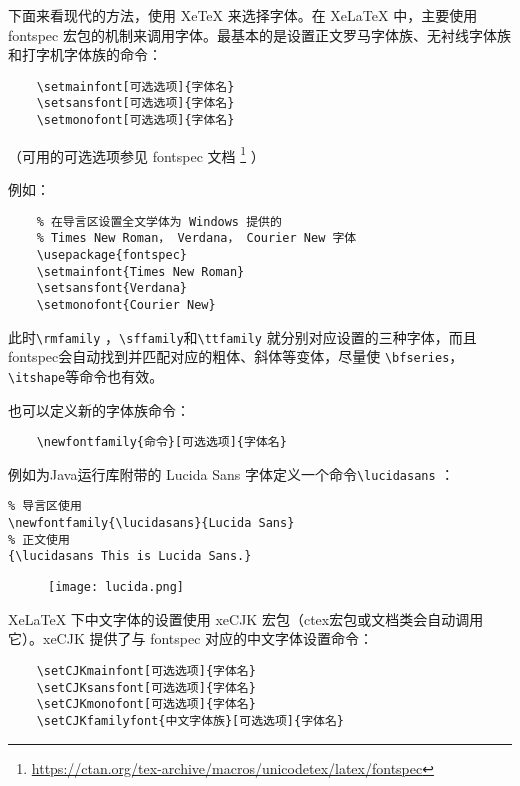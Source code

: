 下面来看现代的方法，使用 XeTeX 来选择字体。在 XeLaTeX 中，主要使用 fontspec 宏包的机制来调用字体。最基本的是设置正文罗马字体族、无衬线字体族和打字机字体族的命令：

\begin{lstlisting}
    \setmainfont[可选选项]{字体名}
    \setsansfont[可选选项]{字体名}
    \setmonofont[可选选项]{字体名}
\end{lstlisting}

（可用的可选选项参见 fontspec 文档 \footnote{\href{https://ctan.org/tex-archive/macros/unicodetex/latex/fontspec}{https://ctan.org/tex-archive/macros/unicodetex/latex/fontspec}} ）

例如：
\begin{lstlisting}
    % 在导言区设置全文学体为 Windows 提供的
    % Times New Roman， Verdana， Courier New 字体
    \usepackage{fontspec}
    \setmainfont{Times New Roman}
    \setsansfont{Verdana}
    \setmonofont{Courier New}
\end{lstlisting}

此时\verb|\rmfamily| ，\verb|\sffamily|和\verb|\ttfamily| 就分别对应设置的三种字体，而且 fontspec会自动找到并匹配对应的粗体、斜体等变体，尽量使 \verb|\bfseries|，\verb|\itshape|等命令也有效。

也可以定义新的字体族命令：
\begin{lstlisting}
    \newfontfamily{命令}[可选选项]{字体名}
\end{lstlisting}

例如为Java运行库附带的 Lucida Sans 字体定义一个命令\verb|\lucidasans| ：

\begin{minipage}[t]{0.45\textwidth}
\begin{lstlisting}
% 导言区使用
\newfontfamily{\lucidasans}{Lucida Sans}
% 正文使用
{\lucidasans This is Lucida Sans.}
\end{lstlisting}
\end{minipage}
\hfill
\begin{minipage}[t]{0.45\textwidth}
\begin{figure}[H]
    \centering
    \texttt{[image: lucida.png]}
\end{figure}
\end{minipage}

XeLaTeX 下中文字体的设置使用 xeCJK 宏包（ctex宏包或文档类会自动调用它）。xeCJK 提供了与 fontspec 对应的中文字体设置命令：
\begin{lstlisting}
    \setCJKmainfont[可选选项]{字体名}
    \setCJKsansfont[可选选项]{字体名}
    \setCJKmonofont[可选选项]{字体名}
    \setCJKfamilyfont{中文字体族}[可选选项]{字体名}
\end{lstlisting}

